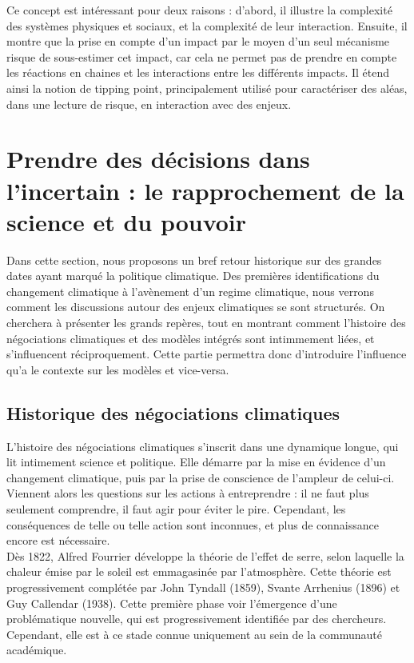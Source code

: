 Ce concept est intéressant pour deux raisons : d'abord, il illustre la complexité des systèmes physiques et sociaux, et la complexité de leur interaction. Ensuite, il montre que la prise en compte d'un impact par le moyen d'un seul mécanisme risque de sous-estimer cet impact, car cela ne permet pas de prendre en compte les réactions en chaines et les interactions entre les différents impacts. Il étend ainsi la notion de tipping point, principalement utilisé pour caractériser des aléas, dans une lecture de risque, en interaction avec des enjeux. 

\section{Prendre des décisions dans l'incertain : le rapprochement de la science et du pouvoir}
\label{sect/1/2}

Dans cette section, nous proposons un bref retour historique sur des grandes dates ayant marqué la politique climatique. Des premières identifications du changement climatique à l'avènement d'un \gls{regime climatique}, nous verrons comment les discussions autour des enjeux climatiques se sont structurés. On cherchera à présenter les grands repères, tout en montrant comment l'histoire des négociations climatiques et des modèles intégrés sont intimmement liées, et s'influencent réciproquement. Cette partie permettra donc d'introduire l'influence qu'a le contexte sur les modèles et vice-versa. 


\subsection{Historique des négociations climatiques}
\label{sect:1.2.1}

L'histoire des négociations climatiques s'inscrit dans une dynamique longue, qui lit intimement science et politique. Elle démarre par la mise en évidence d'un changement climatique, puis par la prise de conscience de l'ampleur de celui-ci. Viennent alors les questions sur les actions à entreprendre : il ne faut plus seulement comprendre, il faut agir pour éviter le pire. Cependant, les conséquences de telle ou telle action sont inconnues, et plus de connaissance encore est nécessaire. \\

Dès 1822, Alfred Fourrier développe la théorie de l'effet de serre, selon laquelle la chaleur émise par le soleil est emmagasinée par l'atmosphère. Cette théorie est progressivement complétée par John Tyndall (1859), Svante Arrhenius (1896) et Guy Callendar (1938). Cette première phase voir l'émergence d'une problématique nouvelle, qui est progressivement identifiée par des chercheurs. Cependant, elle est à ce stade connue uniquement au sein de la communauté académique. \\

